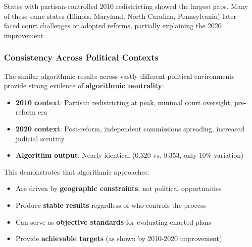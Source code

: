 States with partisan-controlled 2010 redistricting showed the largest gaps. Many of these same states (Illinois, Maryland, North Carolina, Pennsylvania) later faced court challenges or adopted reforms, partially explaining the 2020 improvement.

\subsubsection{Consistency Across Political Contexts}

The similar algorithmic results across vastly different political environments provide strong evidence of \textbf{algorithmic neutrality}:

\begin{itemize}
\item \textbf{2010 context}: Partisan redistricting at peak, minimal court oversight, pre-reform era
\item \textbf{2020 context}: Post-reform, independent commissions spreading, increased judicial scrutiny
\item \textbf{Algorithm output}: Nearly identical (0.320 vs. 0.353, only 10\% variation)
\end{itemize}

This demonstrates that algorithmic approaches:
\begin{itemize}
\item Are driven by \textbf{geographic constraints}, not political opportunities
\item Produce \textbf{stable results} regardless of who controls the process
\item Can serve as \textbf{objective standards} for evaluating enacted plans
\item Provide \textbf{achievable targets} (as shown by 2010-2020 improvement)
\end{itemize}
